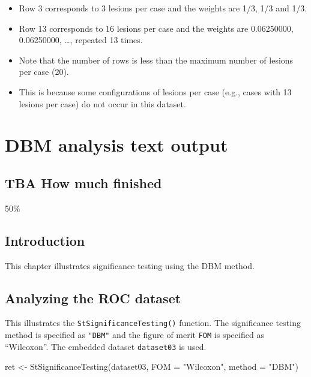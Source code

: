 \documentclass[
]{book}
\newenvironment{Shaded}{\begin{snugshade}}{\end{snugshade}}
\newcommand{\AttributeTok}[1]{\textcolor[rgb]{0.77,0.63,0.00}{#1}}
\newcommand{\FunctionTok}[1]{\textcolor[rgb]{0.00,0.00,0.00}{#1}}
\newcommand{\NormalTok}[1]{#1}
\newcommand{\OtherTok}[1]{\textcolor[rgb]{0.56,0.35,0.01}{#1}}
\newcommand{\StringTok}[1]{\textcolor[rgb]{0.31,0.60,0.02}{#1}}
\providecommand{\tightlist}{%
  \setlength{\itemsep}{0pt}\setlength{\parskip}{0pt}}
\begin{document}
\begin{itemize}
\tightlist
\item
  Row 3 corresponds to 3 lesions per case and the weights are 1/3, 1/3 and 1/3.
\item
  Row 13 corresponds to 16 lesions per case and the weights are 0.06250000, 0.06250000, \ldots, repeated 13 times.
\item
  Note that the number of rows is less than the maximum number of lesions per case (20).
\item
  This is because some configurations of lesions per case (e.g., cases with 13 lesions per case) do not occur in this dataset.
\end{itemize}

\hypertarget{quick-start-dbm-text}{%
\chapter{DBM analysis text output}\label{quick-start-dbm-text}}

\hypertarget{quick-start-dbm-text-how-much-finished}{%
\section{TBA How much finished}\label{quick-start-dbm-text-how-much-finished}}

50\%

\hypertarget{quick-start-dbm-text-intro}{%
\section{Introduction}\label{quick-start-dbm-text-intro}}

This chapter illustrates significance testing using the DBM method.

\hypertarget{quick-start-dbm-text-analyze-dataset}{%
\section{Analyzing the ROC dataset}\label{quick-start-dbm-text-analyze-dataset}}

This illustrates the \texttt{StSignificanceTesting()} function. The significance testing method is specified as \texttt{"DBM"} and the figure of merit \texttt{FOM} is specified as ``Wilcoxon''. The embedded dataset \texttt{dataset03} is used.

\begin{Shaded}
\begin{Highlighting}[]
\NormalTok{ret }\OtherTok{\textless{}{-}} \FunctionTok{StSignificanceTesting}\NormalTok{(dataset03, }\AttributeTok{FOM =} \StringTok{"Wilcoxon"}\NormalTok{, }\AttributeTok{method =} \StringTok{"DBM"}\NormalTok{)}
\end{Highlighting}
\end{Shaded}
\end{document}
